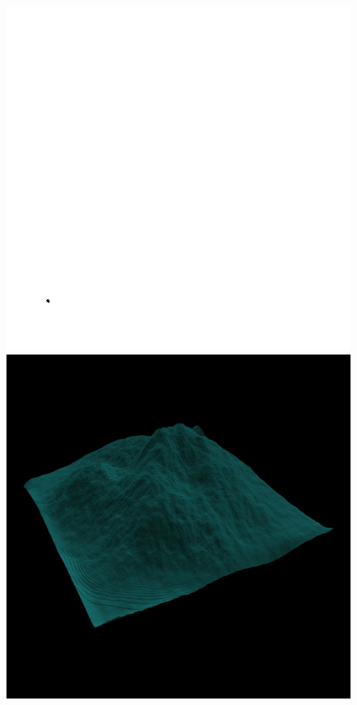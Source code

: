 	\begin{figure}[H]
	  \centering
	  \includegraphics[width=\imagewidth]{images/results/terrains/512-1/perlin/360}
	  \includegraphics[width=\imagewidth]{images/results/terrains/512-1/perlin/360_3d}

\end{figure}
